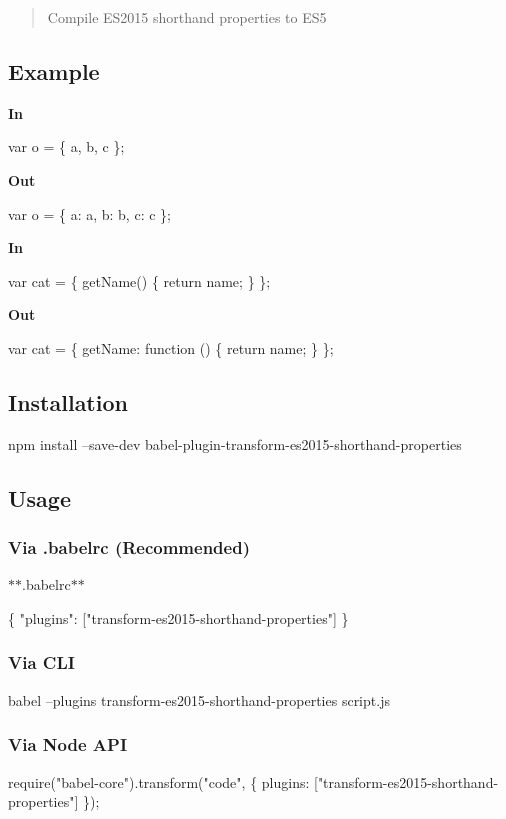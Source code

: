 \begin{quote}
Compile E\+S2015 shorthand properties to E\+S5 \end{quote}


\subsection*{Example}

{\bfseries In}


\begin{DoxyCode}
var o = \{ a, b, c \};
\end{DoxyCode}


{\bfseries Out}


\begin{DoxyCode}
var o = \{ a: a, b: b, c: c \};
\end{DoxyCode}


{\bfseries In}


\begin{DoxyCode}
var cat = \{
  getName() \{
    return name;
  \}
\};
\end{DoxyCode}


{\bfseries Out}


\begin{DoxyCode}
var cat = \{
  getName: function () \{
    return name;
  \}
\};
\end{DoxyCode}


\subsection*{Installation}


\begin{DoxyCode}
npm install --save-dev babel-plugin-transform-es2015-shorthand-properties
\end{DoxyCode}


\subsection*{Usage}

\subsubsection*{Via {\ttfamily .babelrc} (Recommended)}

$\ast$$\ast$.babelrc$\ast$$\ast$


\begin{DoxyCode}
\{
  "plugins": ["transform-es2015-shorthand-properties"]
\}
\end{DoxyCode}


\subsubsection*{Via C\+LI}


\begin{DoxyCode}
babel --plugins transform-es2015-shorthand-properties script.js
\end{DoxyCode}


\subsubsection*{Via Node A\+PI}


\begin{DoxyCode}
require("babel-core").transform("code", \{
  plugins: ["transform-es2015-shorthand-properties"]
\});
\end{DoxyCode}
 